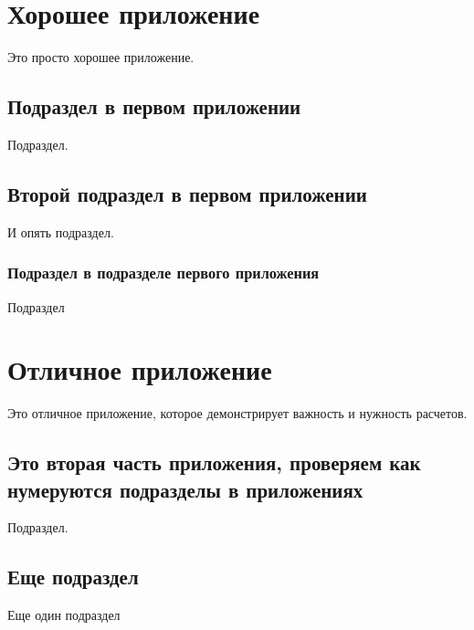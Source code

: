 \documentclass[12pt]{extarticle}
\begin{document}
\section{Хорошее приложение}
\label{sec:org475f076}
Это просто хорошее приложение.
\subsection{Подраздел в первом приложении}
\label{sec:org0225b27}
Подраздел.
\subsection{Второй подраздел в первом приложении}
\label{sec:orgd3646a2}
И опять подраздел.
\subsubsection{Подраздел в подразделе первого приложения}
\label{sec:org91ecbfb}

Подраздел
\section{Отличное приложение}
\label{sec:orgb181560}
Это отличное приложение, которое демонстрирует важность и нужность расчетов.
\subsection{Это вторая часть приложения, проверяем как нумеруются подразделы в приложениях}
\label{sec:org43c9a36}

Подраздел.
\subsection{Еще подраздел}
\label{sec:org40049b1}
Еще один подраздел
\end{document}
